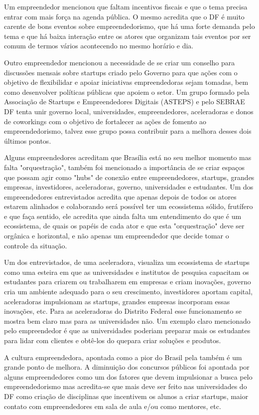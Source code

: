 Um empreendedor mencionou que faltam incentivos fiscais e que o tema precisa entrar com mais força na agenda pública. O mesmo acredita que o DF é muito carente de bons eventos sobre empreendedorismo, que há uma forte demanda pelo tema e que há baixa interação entre os atores que organizam tais eventos por ser comum de termos vários acontecendo no mesmo horário e dia. 

Outro empreendedor mencionou a necessidade de se criar um conselho para discussões mensais sobre startups criado pelo Governo para que ações com o objetivo de flexibilidar e apoiar iniciativas empreendedoras sejam tomadas, bem como desenvolver políticas públicas que apoiem o setor. Um grupo formado pela Associação de Startups e Empreendedores Digitais (ASTEPS) e pelo SEBRAE DF tenta unir governo local, universidades, empreendedores, aceleradoras e donos de coworkings com o objetivo de fortalecer as ações de fomento ao empreendedorismo, talvez esse grupo possa contribuir para a melhora desses  dois últimos pontos.

Alguns empreendedores acreditam que Brasília está no seu melhor momento mas falta "orquestração", também foi mencionado a importância de se criar espaços que possam agir como "hubs" de conexão entre empreendedores, startups, grandes empresas, investidores, aceleradoras, governo, universidades e estudantes. Um dos empreendedores entrevistados acredita que apenas depois de todos os atores estarem alinhados e colaborando será possível ter um ecossistema sólido, frutífero e que faça sentido, ele acredita que ainda falta um entendimento do que é um ecossistema, de quais os papéis de cada ator e que esta "orquestração" deve ser orgânica e horizontal, e não apenas um empreendedor que decide tomar o controle da situação. 

Um dos entrevistados, de uma aceleradora, visualiza um ecossistema de startups como uma esteira em que as universidades e institutos de pesquisa capacitam os estudantes para criarem ou trabalharem em empresas e criam inovações, governo cria um ambiente adequado para o seu crescimento, investidores aportam capital, aceleradoras impulsionam as startups, grandes empresas incorporam essas inovações, etc. Para as aceleradoras do Distrito Federal esse funcionamento se mostra bem claro mas para as universidades não. Um exemplo claro mencionado pelo empreendedor é que as universidades poderiam preparar mais os estudantes para lidar com clientes e obtê-los do quepara criar soluções e produtos.

A cultura empreendedora, apontada como a pior do Brasil pela  também é um grande ponto de melhora. A diminuição dos concursos públicos foi apontada por alguns empreendedores como um dos fatores que devem impulsionar a busca pelo empreendedorismo mas acredita-se que mais deve ser feito nas universidades do DF como criação de disciplinas que incentivem os alunos a criar startups, maior contato com empreendedores em sala de aula e/ou como mentores, etc.

